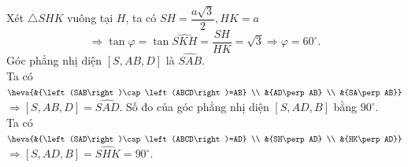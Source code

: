 \begin{ex}
{\begin{itemchoice}
   Xét $\triangle SHK$  vuông tại $H$, ta có $SH=\dfrac{a\sqrt{3}}{2}, HK=a$
   $$\Rightarrow \tan \varphi=\tan \widehat{SKH}=\dfrac{SH}{HK}=\sqrt{3} \Rightarrow  \varphi=60^\circ.
   $$ 
   \itemch Góc  phẳng nhị diện $\left[S,AB,D\right]$ là $\widehat{SAB}$.\\
   Ta có $\heva{&{\left(SAB\right)\cap  \left(ABCD\right)=AB} \\
    &{AD\perp AB} \\
   &{SA\perp AB}}$  $\Rightarrow \left[S,AB,D\right]=\widehat{SAD}$.
   \itemch Số đo của góc phẳng nhị diện  $\left[S,AD,B\right]$ bằng $90^\circ$.\\
   Ta  có $\heva{&{\left(SAD\right)\cap \left(ABCD\right)=AD} \\
    &{SH\perp AD} \\
   &{HK\perp AD}}$ $\Rightarrow \left[S,AD,B\right]=\widehat{SHK}=90^\circ$. 
  \end{itemchoice}
  }
\end{ex}

